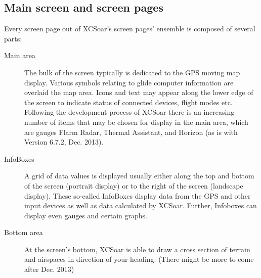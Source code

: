 \subsection*{Main screen and screen pages}
Every screen page out of XCSoar's screen pages' ensemble is composed of several 
parts:
\begin{description}
\item[Main area] The bulk of the screen typically is dedicated to the GPS moving 
map display. Various symbols relating to glide computer information are overlaid 
the map area. Icons and text may appear along the lower edge of the screen
to indicate status of connected devices, flight modes etc.
Following the development process of XCSoar there is an increasing number of 
items that may be chosen for display in the main area, which are gauges 
Flarm Radar, Thermal Assistant, and Horizon (as is with Version 6.7.2, 
Dec. 2013).
\item[InfoBoxes] A grid of data values is displayed usually either along
the top and bottom of the screen (portrait display) or to the right of the
screen (landscape display).  These so-called InfoBoxes display data from the
GPS and other input devices as well as data calculated by XCSoar. Further, 
Infoboxes can display even gauges and certain graphs.
\item[Bottom area] At the screen's bottom, XCSoar is able to draw a cross 
section of terrain and airspaces in direction of your heading. (There might be 
more to come after Dec. 2013)
\end{description}

